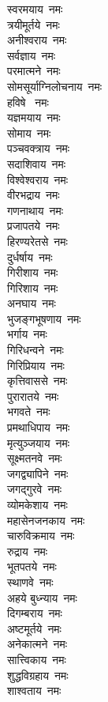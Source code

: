 \begin{multicols}{2}
\begin{flushleft}
स्वरमयाय~नमः\\
त्रयीमूर्तये~नमः\\
अनीश्वराय~नमः\\
सर्वज्ञाय~नमः\\
परमात्मने~नमः\\
सोमसूर्याग्निलोचनाय~नमः\\
हविषे ~नमः\\
यज्ञमयाय~नमः\hfill{}\\
सोमाय~नमः\\
पञ्चवक्त्राय~नमः\\
सदाशिवाय~नमः\\
विश्वेश्वराय~नमः\\
वीरभद्राय~नमः\\
गणनाथाय~नमः\\
प्रजापतये~नमः\\
हिरण्यरेतसे~नमः\\
दुर्धर्षाय~नमः\\
गिरीशाय~नमः\hfill{}\\
गिरिशाय~नमः\\
अनघाय~नमः\\
भुजङ्गभूषणाय~नमः\\
भर्गाय~नमः\\
गिरिधन्वने~नमः\\
गिरिप्रियाय~नमः\\
कृत्तिवाससे~नमः\\
पुरारातये~नमः\\
भगवते~नमः\\
प्रमथाधिपाय~नमः\hfill{}\\
मृत्युञ्जयाय~नमः\\
सूक्ष्मतनवे~नमः\\
जगद्व्यापिने~नमः\\
जगद्गुरवे~नमः\\
व्योमकेशाय~नमः\\
महासेनजनकाय~नमः\\
चारुविक्रमाय~नमः\\
रुद्राय~नमः\\
भूतपतये~नमः\\
स्थाणवे~नमः\hfill{}\\
अहये बुध्न्याय~नमः\\
दिगम्बराय~नमः\\
अष्टमूर्तये~नमः\\
अनेकात्मने~नमः\\
सात्त्विकाय~नमः\\
शुद्धविग्रहाय~नमः\\
शाश्वताय~नमः\\

\end{flushleft}
\end{multicols}

